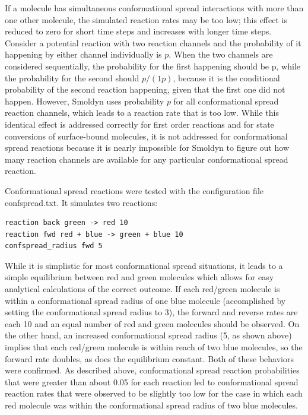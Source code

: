 \documentclass {scrbook}
\begin{document}
If a molecule has simultaneous conformational spread interactions with more than one other molecule, the simulated reaction rates may be too low; this effect is reduced to zero for short time steps and increases with longer time steps. Consider a potential reaction with two reaction channels and the probability of it happening by either channel individually is $p$. When the two channels are considered sequentially, the probability for the first happening should be p, while the probability for the second should $p/(1p)$, because it is the conditional probability of the second reaction happening, given that the first one did not happen. However, Smoldyn uses probability $p$ for all conformational spread reaction channels, which leads to a reaction rate that is too low. While this identical effect is addressed correctly for first order reactions and for state conversions of surface-bound molecules, it is not addressed for conformational spread reactions because it is nearly impossible for Smoldyn to figure out how many reaction channels are available for any particular conformational spread reaction.

Conformational spread reactions were tested with the configuration file confspread.txt. It simulates two reactions:
\begin{lstlisting}[style=SSAC]
reaction back green -> red 10
reaction fwd red + blue -> green + blue 10
confspread_radius fwd 5
\end{lstlisting}
While it is simplistic for most conformational spread situations, it leads to a simple equilibrium between red and green molecules which allows for easy analytical calculations of the correct outcome. If each red/green molecule is within a conformational spread radius of one blue molecule (accomplished by setting the conformational spread radius to 3), the forward and reverse rates are each 10 and an equal number of red and green molecules should be observed. On the other hand, an increased conformational spread radius (5, as shown above) implies that each red/green molecule is within reach of two blue molecules, so the forward rate doubles, as does the equilibrium constant. Both of these behaviors were confirmed. As described above, conformational spread reaction probabilities that were greater than about 0.05 for each reaction led to conformational spread reaction rates that were observed to be slightly too low for the case in which each red molecule was within the conformational spread radius of two blue molecules.
\end{document}
